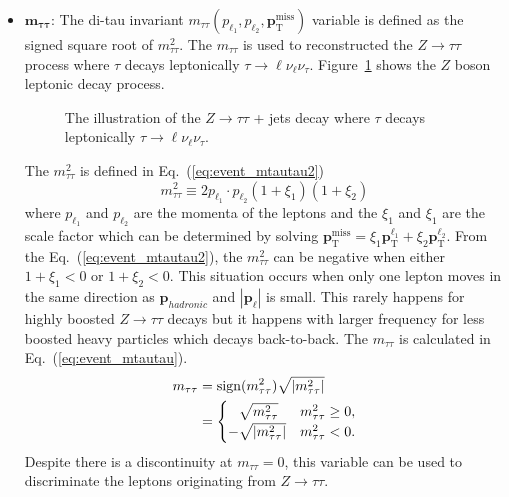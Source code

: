 \begin{itemize}
    \item $\mathbf{m_{\tau\tau}}$: The di-tau invariant $m_{\tau\tau}(p_{\ell_{1}}, p_{\ell_{2}}, \mathbf{p}_{\mathrm{T}}^{\mathrm{miss}})$ variable is defined as the signed square root of $m^{2}_{\tau\tau}$.
    The $m_{\tau\tau}$ is used to reconstructed the $Z \to \tau \tau$ process where $\tau$ decays leptonically $\tau \to \ell \nu_{\ell} \nu_{\tau}$.
    Figure~\ref{fig:event_mtautau} shows the $Z$ boson leptonic decay process.
    \begin{figure}[htb]
        \begin{center}
            
            \caption{The illustration of the $Z \to \tau\tau$ + jets decay where $\tau$ decays leptonically $\tau \to \ell \nu_{\ell} \nu_{\tau}$.}
            \label{fig:event_mtautau}
        \end{center}
    \end{figure}
    The $m^{2}_{\tau\tau}$ is defined in Eq.~(\ref{eq:event_mtautau2})
    \begin{equation}
        m^{2}_{\tau\tau} \equiv 2 p_{\ell_{1}} \cdot p_{\ell_{2}} (1 + \xi_{1})(1+ \xi_{2})
        \label{eq:event_mtautau2}
    \end{equation}
    where $p_{\ell_{1}}$ and $p_{\ell_{2}}$ are the momenta of the leptons and the $\xi_{1}$ and $\xi_{1}$ are the scale factor which can be determined by solving $\mathbf{p}_\mathrm{T}^\mathrm{miss} = \xi_{1} \mathbf{p}_\mathrm{T}^{\ell_{1}} + \xi_{2} \mathbf{p}_\mathrm{T}^{\ell_{2}}$.
    From the Eq.~(\ref{eq:event_mtautau2}), the $m^{2}_{\tau\tau}$ can be negative when either $1 + \xi_{1} < 0$ or $1 + \xi_{2} < 0$.
    This situation occurs when only one lepton moves in the same direction as $\mathbf{p}_{hadronic}$ and $|\mathbf{p}_{\ell}|$ is small. 
    This rarely happens for highly boosted $Z \to \tau \tau$ decays but it happens with larger frequency for less boosted heavy particles which decays back-to-back.
    The $m_{\tau\tau}$ is calculated in Eq.~(\ref{eq:event_mtautau}).
    \begin{align}
        m_{\tau\tau} & = \mathrm{sign}(m^{2}_{\tau\tau}) \sqrt{|m^{2}_{\tau\tau}|}\\
                     & = 
                     \begin{cases}
                         \hphantom{-}\sqrt{m_{\tau\tau}^2}    & m_{\tau\tau}^2 \geq 0,\\
                         -\sqrt{\left| m_{\tau\tau}^2\right|} & m_{\tau\tau}^2 < 0.
                     \end{cases}
        \label{eq:event_mtautau}
    \end{align}
    Despite there is a discontinuity at $m_{\tau\tau} = 0$, this variable can be used to discriminate the leptons originating from $Z\to \tau\tau$.


\end{itemize}

